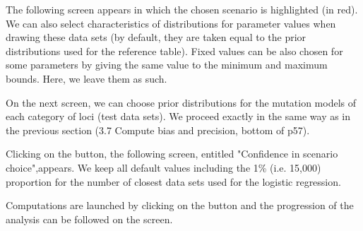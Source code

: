 {%

\newpage
The following screen appears in which the chosen scenario is highlighted (in red). We can also select characteristics of distributions for parameter values when drawing these data sets (by default, they are taken equal to the prior distributions used for the reference table). Fixed values can be also chosen for some parameters by giving the same value to the minimum and maximum bounds. Here, we leave them as such.


On the next screen, we can choose prior distributions for the mutation models of each category of loci (test data sets). We proceed exactly in the same way as in the previous section (3.7 Compute bias and precision, bottom of p57).


\newpage
Clicking on the \fbox{\textsf{$>>$}} button, the following screen, entitled "Confidence in scenario choice",appears. We keep all default values including the  1\% (i.e. 15,000) proportion for the number of closest data sets used for the logistic regression.


Computations are launched by clicking on the    button and the progression of the analysis can be followed on the screen.


}
